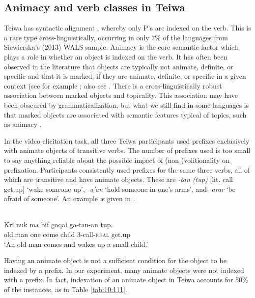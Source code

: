 \subsection{Animacy and verb classes in Teiwa}   
\label{sec:10:5.3}
Teiwa has syntactic alignment , whereby only P's are indexed on the verb. This is a rare type cross-linguistically, occurring in only 7\% of the languages from Siewierska's (2013) \nocite{Siewierska2013} WALS sample. Animacy is the core semantic factor which plays a role in whether an object is indexed on the verb. It has often been observed in the literature that objects  are typically not animate, definite, or specific and that it is marked, if they are animate, definite, or specific in a given context (see for example \citet{Givon1976,Aissen2003}; also see \citet[205-205]{Bickel2008}. There is a cross-linguistically robust association between marked objects and topicality. This association may have been obscured by grammaticalization, but what we still find in some languages is that marked objects are associated with semantic features typical of topics, such as animacy \citep[2]{DalrympleEtAl2011}. 

In the video elicitation task, all three Teiwa participants used prefixes exclusively with animate objects of transitive verbs. The number of prefixes used is too small to say anything reliable about the possible impact of (non-)volitionality on prefixation. Participants consistently used prefixes for the same three verbs, all of which are transitive and have animate objects. These are \textit{{}-tan (tup)} [lit. call get.up] `wake someone up', \textit{{}-u'an} `hold someone in one's arms', and \textit{{}-arar} `be afraid of someone'. An example is given in .


\ea%
\label{bkm:Ref283206596}
 \\ 
\gll   Kri  nuk  ma    {bif goqai}  ga-tan-an  tup. \\  
   old.man  one  come  child  3-call-\textsc{real} get.up  \\
\glt `An old man comes and wakes up a small child.' 
\z




Having an animate object is not a sufficient condition for the object to be indexed by a prefix. In our experiment, many animate objects were not indexed with a prefix. In fact, indexation of an animate object in Teiwa  accounts for 50\% of the instances, as in Table \ref{tab:10:111}. 

